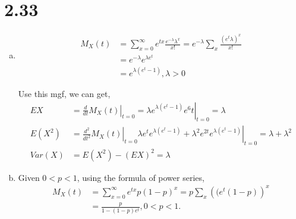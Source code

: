 \documentclass[letterpaper]{article}
\newcommand{\mgf}{M_X(t)}
\begin{document}
    \section*{2.33}
    \begin{enumerate}[(a)]
    \item \begin{align*}
    \mgf & = \sum_{x=0}^\infty e^{tx} \frac{e^{-\lambda}\lambda^x}{x!}
    = e^{-\lambda} \sum_x \frac{(e^t\lambda)^x}{x!} \\
    & = e^{-\lambda} e^{\lambda e^t} \\
    & = e^{\lambda(e^t-1)}, \lambda > 0
    \end{align*}

    Use this mgf, we can get,
    \begin{align*}
    EX & = \left. \frac{d}{dt} \mgf\right|_{t=0} = \left. \lambda e^{\lambda(e^t-1)}e^6t\right|_{t=0} = \lambda \\
    E(X^2) & = \left. \frac{d^2}{dt^2} \mgf\right|_{t=0} \lambda e^t e^{\lambda(e^t-1)} +
    \left. \lambda^2 e^{2t} e^{\lambda(e^t-1)}\right|_{t=0} = \lambda + \lambda^2 \\
    Var(X) & = E(X^2) - (EX)^2 = \lambda
    \end{align*}
    \item 
    Given $0 < p < 1$, using the formula of power series,
    \begin{align*}
    \mgf & = \sum_{x=0}^\infty e^{tx}p(1-p)^x = p \sum_x
    \left((e^t(1-p)\right)^x \\
    & = \frac{p}{1-(1-p)e^t}, 0 < p < 1.
    \end{align*}


\end{enumerate}
\end{document}
